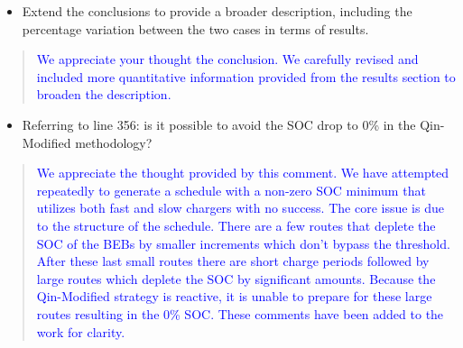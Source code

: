 \documentclass[11pt,a4paper,final]{article}
\begin{document}
\begin{itemize}
\item Extend the conclusions to provide a broader description, including the percentage variation between the two cases in terms of results.
\end{itemize}

\begin{quote}
  \textcolor{blue}{We appreciate your thought the conclusion. We carefully revised and included more quantitative information provided from the results section to broaden the description.}
\end{quote}

\begin{itemize}
\item Referring to line 356: is it possible to avoid the SOC drop to 0\% in the Qin-Modified methodology?
\end{itemize}

\begin{quote}
  \textcolor{blue}{We appreciate the thought provided by this comment. We have attempted repeatedly to generate a schedule with a non-zero SOC minimum that utilizes both fast and slow chargers with no success. The core issue is due to the structure of the schedule. There are a few routes that deplete the SOC of the BEBs by smaller increments which don't bypass the threshold. After these last small routes there are short charge periods followed by large routes which deplete the SOC by significant amounts. Because the Qin-Modified strategy is reactive, it is unable to prepare for these large routes resulting in the 0\% SOC. These comments have been added to the work for clarity.}
\end{quote}
\end{document}

